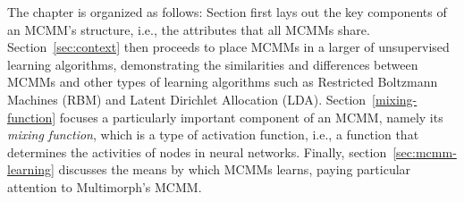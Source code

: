 
The chapter is organized as follows: Section first lays out the key components of an MCMM's structure, i.e., the attributes that all MCMMs share. Section~\ref{sec:context} then proceeds to place MCMMs in a larger of unsupervised learning algorithms, demonstrating 
the similarities and differences between MCMMs and other types of learning algorithms such as Restricted Boltzmann Machines (RBM) and Latent Dirichlet Allocation (LDA). Section~\ref{mixing-function} focuses a particularly important component of an MCMM, namely its \emph{mixing function}, which is a type of activation function, i.e., a function that determines the activities of nodes in neural networks.  
Finally, section~\ref{sec:mcmm-learning} discusses the means by which MCMMs learns, paying particular attention to Multimorph's MCMM.


